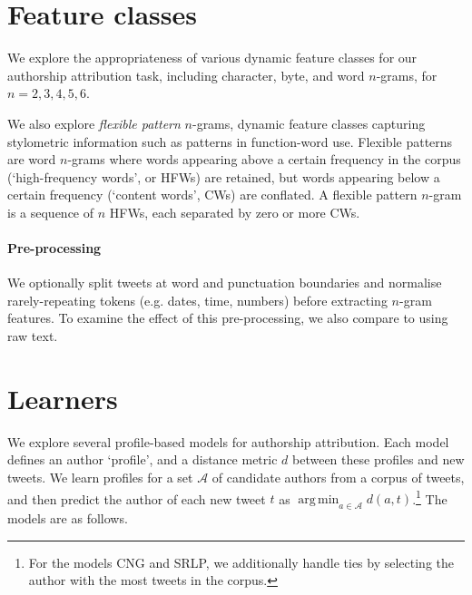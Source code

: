 \documentclass[twocolumn,10pt]{article}
\DeclareMathOperator*{\argmin}{arg\,min}
\begin{document}
\section{Feature classes}
We explore the appropriateness of various dynamic feature
classes for our authorship attribution task, including
character, byte, and word $n$-grams, for $n = 2,3,4,5,6$.

We also explore \emph{flexible pattern} $n$-grams, dynamic
feature classes capturing stylometric information such as
patterns in function-word use\supercite{schwartz2013authorship}.
Flexible patterns are word $n$-grams where words appearing
above a certain frequency in the corpus (`high-frequency words',
or HFWs) are retained, but words appearing below a certain
frequency (`content words', CWs) are conflated. A flexible
pattern $n$-gram is a sequence of $n$ HFWs, each separated
by zero or more CWs.


\paragraph{Pre-processing}
We optionally split tweets at word and punctuation boundaries and
normalise rarely-repeating tokens (e.g. dates, time, numbers)
before extracting $n$-gram features. To examine the effect of
this pre-processing, we also compare to using raw text.


\section{Learners}

We explore several profile-based models for authorship attribution.
Each model defines an author  `profile', and a distance metric $d$
between these profiles and new tweets.
We learn profiles for a set $\mathcal{A}$ of candidate authors from
a corpus of tweets, and then predict the author of each new tweet
$t$ as $\argmin_{a \in \mathcal{A}} d(a, t)$.\footnote{
For the models CNG and SRLP, we additionally handle ties
by selecting the author with the most tweets in the corpus.}
The models are as follows.
\end{document}
